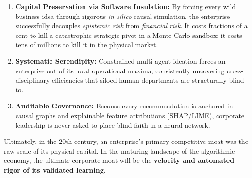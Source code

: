\documentclass[11pt, a4paper]{article}
\begin{document}
\begin{enumerate}[label=\textbf{\arabic*.}, leftmargin=*]
    \item \textbf{Capital Preservation via Software Insulation:} By forcing every wild business idea through rigorous \textit{in silico} causal simulation, the enterprise successfully decouples \textit{epistemic risk} from \textit{financial risk}. It costs fractions of a cent to kill a catastrophic strategic pivot in a Monte Carlo sandbox; it costs tens of millions to kill it in the physical market.
    
    \item \textbf{Systematic Serendipity:} Constrained multi-agent ideation forces an enterprise out of its local operational maxima, consistently uncovering cross-disciplinary efficiencies that siloed human departments are structurally blind to.
    
    \item \textbf{Auditable Governance:} Because every recommendation is anchored in causal graphs and explainable feature attributions (SHAP/LIME), corporate leadership is never asked to place blind faith in a neural network. 
\end{enumerate}

Ultimately, in the 20th century, an enterprise's primary competitive moat was the raw scale of its physical capital. In the maturing landscape of the algorithmic economy, the ultimate corporate moat will be the \textbf{velocity and automated rigor of its validated learning.}
\end{document}
